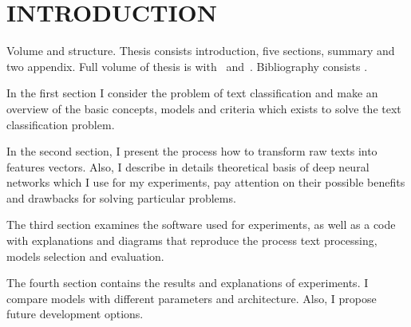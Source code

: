 \chapter*{INTRODUCTION}							%

\newcommand{\actuality}{Relevance of the problem:}
\newcommand{\aim}{Objective}
\newcommand{\tasks}{Task}
\newcommand{\defpositions}{\textbf{Основные положения, выносимые на~защиту:}}
\newcommand{\novelty}{Scientific novelty:}
\newcommand{\influence}{Scientific and practical significance}
\newcommand{\reliability}{\textbf{Степень достоверности}}
\newcommand{\probation}{\textbf{Апробация работы.}}
\newcommand{\contribution}{Personal contribution.}
\newcommand{\publications}{Publications.}

%

Volume and structure. Thesis consists introduction, five sections, summary and two appendix.
Full volume of thesis is  
with~
and~.
Bibliography consists .

In the first section I consider the problem of text classification and make an overview of the basic concepts, models and criteria which exists to solve the text classification problem.

In the second section, I present the process how to transform raw texts into features vectors. Also, I describe in details theoretical basis of deep neural networks which I use for my experiments, pay attention on their possible benefits and drawbacks for solving particular problems.

The third section examines the software used for experiments, as well as a code with explanations and diagrams that reproduce the process text processing, models selection and evaluation. 

The fourth section contains the results and explanations of experiments. I compare models with different parameters and architecture. Also, I propose future development options.
